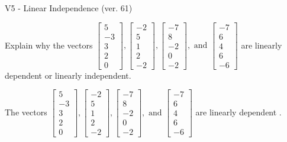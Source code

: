 \begin{exercise}
  \begin{exerciseTitle}V5 - Linear Independence (ver. 61)\end{exerciseTitle}
  \begin{exerciseStatement}
    Explain why the vectors \(\left[\begin{array}{r}
5 \\
-3 \\
3 \\
2 \\
0
\end{array}\right] , \left[\begin{array}{r}
-2 \\
5 \\
1 \\
2 \\
-2
\end{array}\right] , \left[\begin{array}{r}
-7 \\
8 \\
-2 \\
0 \\
-2
\end{array}\right] , \text{ and } \left[\begin{array}{r}
-7 \\
6 \\
4 \\
6 \\
-6
\end{array}\right]\) are linearly dependent or linearly independent.	


  \end{exerciseStatement}
  \begin{exerciseAnswer}
   The vectors \(\left[\begin{array}{r}
5 \\
-3 \\
3 \\
2 \\
0
\end{array}\right] , \left[\begin{array}{r}
-2 \\
5 \\
1 \\
2 \\
-2
\end{array}\right] , \left[\begin{array}{r}
-7 \\
8 \\
-2 \\
0 \\
-2
\end{array}\right] , \text{ and } \left[\begin{array}{r}
-7 \\
6 \\
4 \\
6 \\
-6
\end{array}\right]\) are 
  	 linearly dependent  .
  


  \end{exerciseAnswer}
\end{exercise}